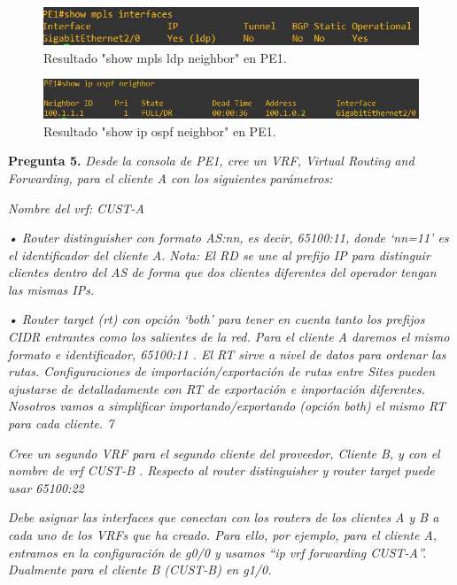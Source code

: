 \documentclass[a4paper, 12pt]{report}
\begin{document}
\begin{figure}[H]
	\centering
	\includegraphics[scale=0.7]{showmplspe1.png}
	\caption{Resultado "show mpls ldp neighbor" en PE1.}
	\label{fig:showmplspe1}
\end{figure}

\begin{figure}[H]
	\centering
	\includegraphics[scale=0.7]{ospfneighborpe1.png}
	\caption{Resultado "show ip ospf neighbor" en PE1.}
	\label{fig:ospfneighborpe1}
\end{figure}

\textbf{Pregunta 5.}
\textit{ Desde la consola de PE1, cree un VRF, Virtual Routing and Forwarding, para el cliente A con
los siguientes parámetros:}


\textit{Nombre del vrf: CUST-A}

\textit{• Router distinguisher con formato AS:nn, es decir, 65100:11, donde ‘nn=11’ es el
identificador del cliente A. Nota: El RD se une al prefijo IP para distinguir clientes
dentro del AS de forma que dos clientes diferentes del operador tengan las mismas
IPs.}

\textit{• Router target (rt) con opción ‘both’ para tener en cuenta tanto los prefijos CIDR
entrantes como los salientes de la red. Para el cliente A daremos el mismo formato e
identificador, 65100:11 . El RT sirve a nivel de datos para ordenar las rutas.
Configuraciones de importación/exportación de rutas entre Sites pueden ajustarse de
detalladamente con RT de exportación e importación diferentes. Nosotros vamos a
simplificar importando/exportando (opción both) el mismo RT para cada cliente.
7}


\textit{Cree un segundo VRF para el segundo cliente del proveedor, Cliente B, y con el
nombre de vrf CUST-B . Respecto al router distinguisher y router target puede usar
65100:22}

\textit{Debe asignar las interfaces que conectan con los routers de los clientes A y B a cada
uno de los VRFs que ha creado. Para ello, por ejemplo, para el cliente A, entramos en
la configuración de g0/0 y usamos “ip vrf forwarding CUST-A”. Dualmente para el
cliente B (CUST-B) en g1/0.}
\end{document}
